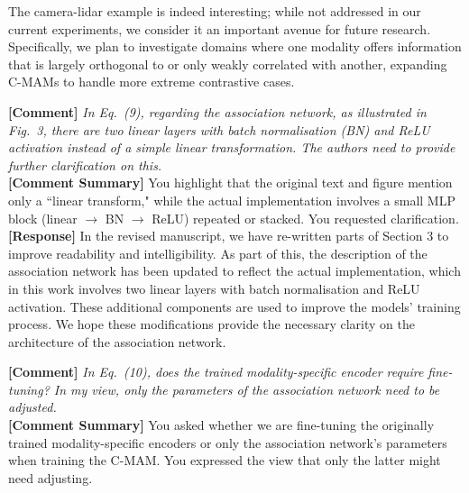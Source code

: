 \documentclass{article}
\begin{document}
The camera-lidar example is indeed interesting; while not addressed in our current experiments, we consider it an important avenue for future research. Specifically, we plan to investigate domains where one modality offers information that is largely orthogonal to or only weakly correlated with another, expanding C-MAMs to handle more extreme contrastive cases.

\vspace{0.25cm}
\hline
\vspace{0.25cm}

\noindent\textbf{[Comment]} \textit{In Eq.\ (9), regarding the association network, as illustrated in Fig.\ 3, there are two linear layers with batch normalisation (BN) and ReLU activation instead of a simple linear transformation. The authors need to provide further clarification on this.} 
\\

\noindent\textbf{[Comment Summary]} You highlight that the original text and figure mention only a ``linear transform," while the actual implementation involves a small MLP block (linear $\to$ BN $\to$ ReLU) repeated or stacked. You requested clarification.
\\

\noindent\textbf{[Response]} In the revised manuscript, we have re-written parts of Section 3 to improve readability and intelligibility. As part of this, the description of the association network has been updated to reflect the actual implementation, which in this work involves two linear layers with batch normalisation and ReLU activation. These additional components are used to improve the models' training process. We hope these modifications provide the necessary clarity on the architecture of the association network. 

\vspace{0.25cm}
\hline
\vspace{0.25cm}

\noindent\textbf{[Comment]} \textit{In Eq.\ (10), does the trained modality-specific encoder require fine-tuning? In my view, only the parameters of the
association network need to be adjusted.}
\\

\noindent\textbf{[Comment Summary]} You asked whether we are fine-tuning the originally trained modality-specific encoders or only the association network's parameters when training the C-MAM. You expressed the view that only the latter might need adjusting.
\\
\end{document}
